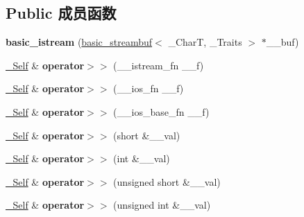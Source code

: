 \subsection*{Public 成员函数}
\begin{DoxyCompactItemize}
\item 
\mbox{\label{classbasic__istream_a451ac87f9d8dbd50eeca4c7594e6d9f5}} 
{\bfseries basic\+\_\+istream} (\hyperlink{classbasic__streambuf}{basic\+\_\+streambuf}$<$ \+\_\+\+CharT, \+\_\+\+Traits $>$ $\ast$\+\_\+\+\_\+buf)
\item 
\mbox{\label{classbasic__istream_a886ddaec9b0257af7df845531eebb767}} 
\hyperlink{classbasic__istream}{\+\_\+\+Self} \& {\bfseries operator$>$$>$} (\+\_\+\+\_\+istream\+\_\+fn \+\_\+\+\_\+f)
\item 
\mbox{\label{classbasic__istream_a1b701fa15d70b3bd9a0e941d99962d7d}} 
\hyperlink{classbasic__istream}{\+\_\+\+Self} \& {\bfseries operator$>$$>$} (\+\_\+\+\_\+ios\+\_\+fn \+\_\+\+\_\+f)
\item 
\mbox{\label{classbasic__istream_a0f50426d77a8cc93b1ee8c45ad2e0b5f}} 
\hyperlink{classbasic__istream}{\+\_\+\+Self} \& {\bfseries operator$>$$>$} (\+\_\+\+\_\+ios\+\_\+base\+\_\+fn \+\_\+\+\_\+f)
\item 
\mbox{\label{classbasic__istream_afd202b4a9ff2ebe23c9cbd56a93b22d6}} 
\hyperlink{classbasic__istream}{\+\_\+\+Self} \& {\bfseries operator$>$$>$} (short \&\+\_\+\+\_\+val)
\item 
\mbox{\label{classbasic__istream_a94cf9558ed27461c10048932a5992c4e}} 
\hyperlink{classbasic__istream}{\+\_\+\+Self} \& {\bfseries operator$>$$>$} (int \&\+\_\+\+\_\+val)
\item 
\mbox{\label{classbasic__istream_a852e0e7767979f8acab89ce81be10c3e}} 
\hyperlink{classbasic__istream}{\+\_\+\+Self} \& {\bfseries operator$>$$>$} (unsigned short \&\+\_\+\+\_\+val)
\item 
\mbox{\label{classbasic__istream_a318047809a8a0e9f9071519939df7f93}} 
\hyperlink{classbasic__istream}{\+\_\+\+Self} \& {\bfseries operator$>$$>$} (unsigned int \&\+\_\+\+\_\+val)

\end{DoxyCompactItemize}
